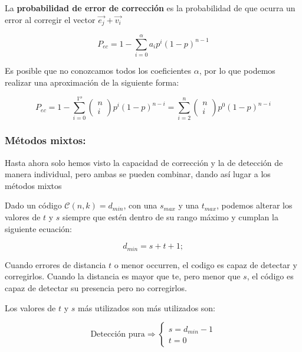 \documentclass{article}
\begin{document}
La \textbf{probabilidad de error de corrección} es la probabilidad de que ocurra un error al corregir el vector $\vec{e_j} + \vec{v_i}$

\begin{equation}
    P_{ec} = 1 - \sum_{i=0}^{\alpha}a_ip^i(1-p)^{n-1}
\end{equation}

Es posible que no conozcamos todos los coeficientes $\alpha$, por lo que podemos realizar una aproximación de la siguiente forma:

\begin{equation}
    P_{ec} = 1 - \sum_{i=0}^{1º}
    \left(
        \begin{array}{c}
            n \\
            i
        \end{array}
    \right)
    p^i (1-p)^{n-i}
    = \sum_{i=2}^{n}
    \left(
        \begin{array}{c}
            n \\
            i
        \end{array}
    \right)
    p^0 (1-p)^{n-i}
\end{equation}

\subsubsection{Métodos mixtos:}

Hasta ahora solo hemos visto la capacidad de corrección y la de detección de manera individual, pero ambas se pueden combinar, dando así lugar a los métodos mixtos

Dado un código $\mathcal{C}(n,k) = d_{min}$, con una $s_{max}$ y una $t_{max}$, podemos alterar los valores de $t$ y $s$ siempre que estén dentro de su rango máximo y cumplan la siguiente ecuación:

\begin{equation}
    d_{min} = s+t+1;
\end{equation}

Cuando errores de distancia $t$ o menor occurren, el codigo es capaz de detectar y corregirlos. Cuando la distancia es mayor que te, pero menor que $s$, el código es capaz de detectar su presencia pero no corregirlos.

Los valores de $t$ y $s$ más utilizados son más utilizados son:

\begin{equation}
    \text{Detección pura}
    \Rightarrow
    \left\{
        \begin{array}{c}
            s = d_{min}-1 \\
            t = 0
        \end{array}
    \right.
\end{equation}
\end{document}
